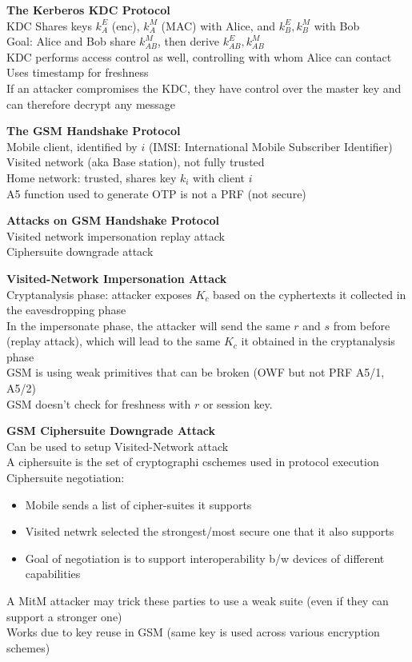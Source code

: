 \documentclass{article}
\begin{document}
\textbf{The Kerberos KDC Protocol}\\
KDC Shares keys $k_A^E$ (enc), $k_A^M$ (MAC) with Alice, and $k^E_B,k^M_B$ with Bob\\
Goal: Alice and Bob share $k_{AB}^M$, then derive $k^E_{AB},k^M_{AB}$\\
KDC performs access control as well, controlling with whom Alice can contact\\
Uses timestamp for freshness\\
If an attacker compromises the KDC, they have control over the master key and can therefore decrypt any message

\textbf{The GSM Handshake Protocol}\\
Mobile client, identified by $i$ (IMSI: International Mobile Subscriber Identifier)\\
Visited network (aka Base station), not fully trusted\\
Home network: trusted, shares key $k_i$ with client $i$\\
A5 function used to generate OTP is not a PRF (not secure)

\textbf{Attacks on GSM Handshake Protocol}\\
Visited network impersonation replay attack\\
Ciphersuite downgrade attack

\textbf{Visited-Network Impersonation Attack}\\
Cryptanalysis phase: attacker exposes $K_c$ based on the cyphertexts it collected in the eavesdropping phase\\
In the impersonate phase, the attacker will send the same $r$ and $s$ from before (replay attack), which will lead to the same $K_c$ it obtained in the cryptanalysis phase\\
GSM is using weak primitives that can be broken (OWF but not PRF A5/1, A5/2)\\
GSM doesn't check for freshness with $r$ or session key.

\textbf{GSM Ciphersuite Downgrade Attack}\\
Can be used to setup Visited-Network attack\\
A ciphersuite is the set of cryptographi cschemes used in protocol execution\\
Ciphersuite negotiation:\begin{itemize}
	\item Mobile sends a list of cipher-suites it supports
	\item Visited netwrk selected the strongest/most secure one that it also supports
	\item Goal of negotiation is to support interoperability b/w devices of different capabilities
\end{itemize}
A MitM attacker may trick these parties to use a weak suite (even if they can support a stronger one)\\
Works due to key reuse in GSM (same key is used across various encryption schemes)
\end{document}
